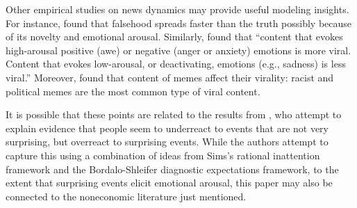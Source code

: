 



Other empirical studies on news dynamics may provide useful modeling insights. For instance, \href{https://science.sciencemag.org/content/359/6380/1146}{\cite{vosoughi_spread_2018}} found that falsehood spreads faster than the truth possibly because of its novelty and emotional arousal.  Similarly, \href{https://journals.sagepub.com/doi/10.1509/jmr.10.0353}{\cite{berger2012makes}} found that ``content that evokes high-arousal positive (awe) or negative (anger or anxiety) emotions is more viral. Content that evokes low-arousal, or deactivating, emotions (e.g., sadness) is less viral.'' Moreover,  \href{https://arxiv.org/abs/1805.12512}{\cite{zannettou2018origins}} found that content of memes affect their virality: racist and political memes are the most common type of viral content.

It is possible that these points are related to the results from \cite{kohlhasasymmetric}, who attempt to explain evidence that people seem to underreact to events that are not very surprising, but overreact to surprising events.  While the authors attempt to capture this using a combination of ideas from Sims's rational inattention framework and the Bordalo-Shleifer diagnostic expectations framework, to the extent that surprising events elicit emotional arousal, this paper may also be connected to the noneconomic literature just mentioned.  %


